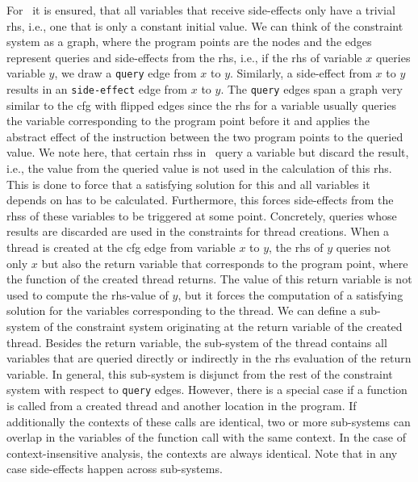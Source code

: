   For \gob\ it is ensured, that all variables that receive side-effects only have a trivial \ac{rhs}, i.e., one that is only a constant initial value.
  We can think of the constraint system as a graph, where the program points are the nodes and the edges represent queries and side-effects from the \ac{rhs}, i.e., if the \ac{rhs} of variable $x$ queries variable $y$, we draw a \texttt{query} edge from $x$ to $y$. Similarly, a side-effect from $x$ to $y$ results in an \texttt{side-effect} edge from $x$ to $y$. The \texttt{query} edges span a graph very similar to the \ac{cfg} with flipped edges since the \ac{rhs} for a variable usually queries the variable corresponding to the program point before it and applies the abstract effect of the instruction between the two program points to the queried value.
  We note here, that certain \acp{rhs} in \gob\ query a variable but discard the result, i.e., the value from the queried value is not used in the calculation of this \ac{rhs}. This is done to force that a satisfying solution for this and all variables it depends on has to be calculated. Furthermore, this forces side-effects from the \acp{rhs} of these variables to be triggered at some point. Concretely, queries whose results are discarded are used in the constraints for thread creations. When a thread is created at the \ac{cfg} edge from variable $x$ to $y$, the \ac{rhs} of $y$ queries not only $x$ but also the return variable that corresponds to the program point, where the function of the created thread returns. The value of this return variable is not used to compute the \ac{rhs}-value of $y$, but it forces the computation of a satisfying solution for the variables corresponding to the thread.
  We can define a sub-system of the constraint system originating at the return variable of the created thread. Besides the return variable, the sub-system of the thread contains all variables that are queried directly or indirectly in the \ac{rhs} evaluation of the return variable. In general, this sub-system is disjunct from the rest of the constraint system with respect to \texttt{query} edges. However, there is a special case if a function is called from a created thread and another location in the program. If additionally the contexts of these calls are identical, two or more sub-systems can overlap in the variables of the function call with the same context. In the case of context-insensitive analysis, the contexts are always identical. Note that in any case side-effects happen across sub-systems.



